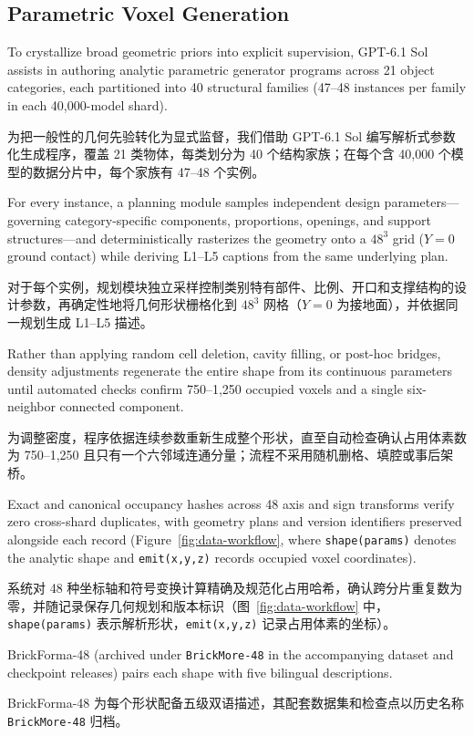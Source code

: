 \documentclass[11pt,letterpaper]{article}
\newcommand{\zh}[1]{{\chinesefont #1}}
\newcommand{\pair}[2]{\par\addvspace{4pt}\noindent
  \begin{minipage}{\linewidth}\raggedright
  #1\par\nobreak\vspace{1pt}
  {\color{translation}\chinesefont\fontsize{10.5}{15.3}\selectfont #2\par}
  \end{minipage}\par}
\begin{document}
\label{sec:dataset}

\subsection{Parametric Voxel Generation\enspace\zh{参数化体素生成}}

\pair{To crystallize broad geometric priors into explicit supervision, GPT-6.1 Sol assists in authoring analytic parametric generator programs across 21 object categories, each partitioned into 40 structural families (47--48 instances per family in each 40,000-model shard).}{为把一般性的几何先验转化为显式监督，我们借助 GPT-6.1 Sol 编写解析式参数化生成程序，覆盖 21 类物体，每类划分为 40 个结构家族；在每个含 40,000 个模型的数据分片中，每个家族有 47–48 个实例。}

\pair{For every instance, a planning module samples independent design parameters---governing category-specific components, proportions, openings, and support structures---and deterministically rasterizes the geometry onto a $48^3$ grid ($Y{=}0$ ground contact) while deriving L1--L5 captions from the same underlying plan.}{对于每个实例，规划模块独立采样控制类别特有部件、比例、开口和支撑结构的设计参数，再确定性地将几何形状栅格化到 $48^3$ 网格（$Y=0$ 为接地面），并依据同一规划生成 L1–L5 描述。}

\pair{Rather than applying random cell deletion, cavity filling, or post-hoc bridges, density adjustments regenerate the entire shape from its continuous parameters until automated checks confirm 750--1,250 occupied voxels and a single six-neighbor connected component.}{为调整密度，程序依据连续参数重新生成整个形状，直至自动检查确认占用体素数为 750–1,250 且只有一个六邻域连通分量；流程不采用随机删格、填腔或事后架桥。}

\pair{Exact and canonical occupancy hashes across 48 axis and sign transforms verify zero cross-shard duplicates, with geometry plans and version identifiers preserved alongside each record (Figure~\ref{fig:data-workflow}, where \texttt{shape(params)} denotes the analytic shape and \texttt{emit(x,y,z)} records occupied voxel coordinates).}{系统对 48 种坐标轴和符号变换计算精确及规范化占用哈希，确认跨分片重复数为零，并随记录保存几何规划和版本标识（图~\ref{fig:data-workflow} 中，\texttt{shape(params)} 表示解析形状，\texttt{emit(x,y,z)} 记录占用体素的坐标）。}

\pair{BrickForma-48 (archived under \texttt{BrickMore-48} in the accompanying dataset and checkpoint releases) pairs each shape with five bilingual descriptions.}{BrickForma-48 为每个形状配备五级双语描述，其配套数据集和检查点以历史名称 \texttt{BrickMore-48} 归档。}
\end{document}
